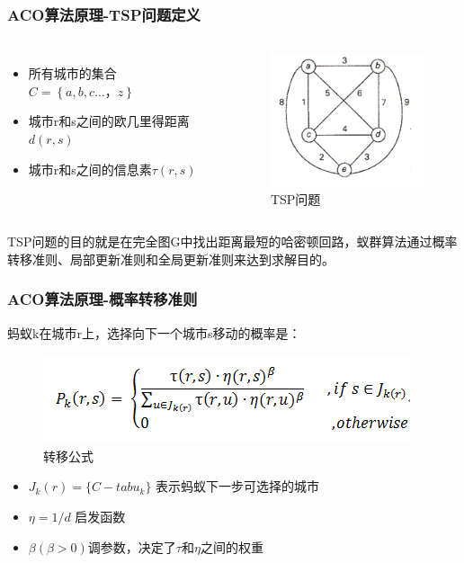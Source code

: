 \begin{frame}
	\frametitle{ACO算法原理-TSP问题定义}
	\begin{columns}
		\begin{itemize}
			\item{所有城市的集合$C=\left\{ a,b,c…，z \right\}$}
			\item{城市r和s之间的欧几里得距离$d(r,s)$}
			\item{城市r和s之间的信息素$\tau(r,s)$}
		\end{itemize}
		\begin{figure}[htbp]
			\centering
			\includegraphics[width=5cm]{pic/ant2.png}
			\caption{TSP问题}
		\end{figure}
	\end{columns}
	TSP问题的目的就是在完全图G中找出距离最短的哈密顿回路，蚁群算法通过概率转移准则、局部更新准则和全局更新准则来达到求解目的。
\end{frame}


\begin{frame}
	\frametitle{ACO算法原理-概率转移准则}
	蚂蚁k在城市r上，选择向下一个城市s移动的概率是：
	\begin{figure}[htbp]
		\centering
		\includegraphics{pic/ant3.jpg}
		\caption{转移公式}
	\end{figure}
	\begin{itemize}
			\item{$J_k(r) = \{ C-tabu_k \}$ 表示蚂蚁下一步可选择的城市}
			\item{$\eta = 1/d$ 启发函数}
			\item{$\beta(\beta>0)$调参数，决定了$\tau$和$\eta$之间的权重}
		\end{itemize}
\end{frame}


